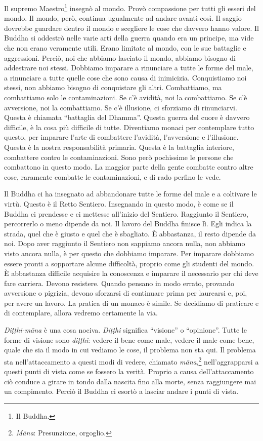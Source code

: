 Il supremo Maestro\footnote{Il Buddha.} insegnò al mondo. Provò
compassione per tutti gli esseri del mondo. Il mondo, però, continua
ugualmente ad andare avanti così. Il saggio dovrebbe guardare dentro il
mondo e scegliere le cose che davvero hanno valore. Il Buddha si
addestrò nelle varie arti della guerra quando era un principe, ma vide
che non erano veramente utili. Erano limitate al mondo, con le sue
battaglie e aggressioni. Perciò, noi che abbiamo lasciato il mondo,
abbiamo bisogno di addestrare noi stessi. Dobbiamo imparare a rinunciare
a tutte le forme del male, a rinunciare a tutte quelle cose che sono
causa di inimicizia. Conquistiamo noi stessi, non abbiamo bisogno di
conquistare gli altri. Combattiamo, ma combattiamo solo le
contaminazioni. Se c'è avidità, noi la combattiamo. Se c'è avversione,
noi la combattiamo. Se c'è illusione, ci sforziamo di rinunciarvi.
Questa è chiamata ``battaglia del Dhamma''. Questa guerra del cuore è
davvero difficile, è la cosa più difficile di tutte. Diventiamo monaci
per contemplare tutto questo, per imparare l'arte di combattere
l'avidità, l'avversione e l'illusione. Questa è la nostra responsabilità
primaria. Questa è la battaglia interiore, combattere contro le
contaminazioni. Sono però pochissime le persone che combattono in questo
modo. La maggior parte della gente combatte contro altre cose, raramente
combatte le contaminazioni, e di rado perfino le vede.

Il Buddha ci ha insegnato ad abbandonare tutte le forme del male e a
coltivare le virtù. Questo è il Retto Sentiero. Insegnando in questo
modo, è come se il Buddha ci prendesse e ci mettesse all'inizio del
Sentiero. Raggiunto il Sentiero, percorrerlo o meno dipende da noi. Il
lavoro del Buddha finisce lì. Egli indica la strada, quel che è giusto e
quel che è sbagliato. È abbastanza, il resto dipende da noi. Dopo aver
raggiunto il Sentiero non sappiamo ancora nulla, non abbiamo visto
ancora nulla, è per questo che dobbiamo imparare. Per imparare dobbiamo
essere pronti a sopportare alcune difficoltà, proprio come gli studenti
del mondo. È abbastanza difficile acquisire la conoscenza e imparare il
necessario per chi deve fare carriera. Devono resistere. Quando pensano
in modo errato, provando avversione o pigrizia, devono sforzarsi di
continuare prima per laurearsi e, poi, per avere un lavoro. La pratica
di un monaco è simile. Se decidiamo di praticare e di contemplare,
allora vedremo certamente la via.

\emph{Diṭṭhi-māna} è una cosa nociva. \emph{Diṭṭhi} significa
``visione'' o ``opinione''. Tutte le forme di visione sono
\emph{diṭṭhi}: vedere il bene come male, vedere il male come bene, quale
che sia il modo in cui vediamo le cose, il problema non sta qui. Il
problema sta nell'attaccamento a questi modi di vedere, chiamato
\emph{māna},\footnote{\emph{Māna}: Presunzione, orgoglio.}
nell'aggrapparsi a questi punti di vista come se fossero la verità.
Proprio a causa dell'attaccamento ciò conduce a girare in tondo dalla
nascita fino alla morte, senza raggiungere mai un compimento. Perciò il
Buddha ci esortò a lasciar andare i punti di vista.

